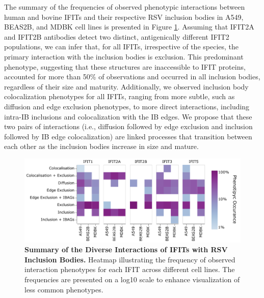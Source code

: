 The summary of the frequencies of observed phenotypic interactions between human and bovine IFITs and their respective RSV inclusion bodies in A549, BEAS2B, and MDBK cell lines is presented in Figure \ref{fig:Summary of the Diverse Interactions of IFITs with RSV Inclusion Bodies}. Assuming that IFIT2A and IFIT2B antibodies detect two distinct, antigenically different IFIT2 populations, we can infer that, for all IFITs, irrespective of the species, the primary interaction with the inclusion bodies is exclusion. This predominant phenotype, suggesting that these structures are inaccessible to IFIT proteins, accounted for more than 50\% of observations and occurred in all inclusion bodies, regardless of their size and maturity. Additionally, we observed inclusion body colocalization phenotypes for all IFITs, ranging from more subtle, such as diffusion and edge exclusion phenotypes, to more direct interactions, including intra-IB inclusions and colocalization with the IB edges. We propose that these two pairs of interactions (i.e., diffusion followed by edge exclusion and inclusion followed by IB edge colocalization) are linked processes that transition between each other as the inclusion bodies increase in size and mature.

\begin{figure}
    \centering
    \includegraphics[width=1\linewidth]{08. Chapter 3/Figs/heatmap_infection.pdf}
    \caption[Summary of the Diverse Interactions of IFITs with RSV Inclusion Bodies.]{\textbf{Summary of the Diverse Interactions of IFITs with RSV Inclusion Bodies.} Heatmap illustrating the frequency of observed interaction phenotypes for each IFIT across different cell lines. The frequencies are presented on a log10 scale to enhance visualization of less common phenotypes.}
    \label{fig:Summary of the Diverse Interactions of IFITs with RSV Inclusion Bodies}
\end{figure}

